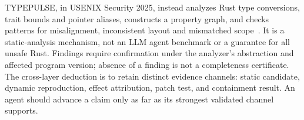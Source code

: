 TYPEPULSE, in USENIX Security 2025, instead analyzes Rust type conversions, trait bounds and pointer aliases, constructs a property graph, and checks patterns for misalignment, inconsistent layout and mismatched scope~\cite{chen2025typepulse}. It is a static-analysis mechanism, not an LLM agent benchmark or a guarantee for all unsafe Rust. Findings require confirmation under the analyzer's abstraction and affected program version; absence of a finding is not a completeness certificate. The cross-layer deduction is to retain distinct evidence channels: static candidate, dynamic reproduction, effect attribution, patch test, and containment result. An agent should advance a claim only as far as its strongest validated channel supports.

